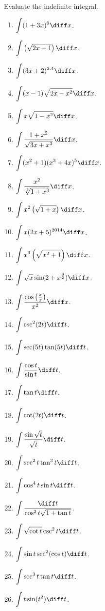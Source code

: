 Evaluate the indefinite integral.
\begin{multicols}{3}
\begin{enumerate}
\item $\displaystyle\int (1+3x)^9 \diff x $.
\item $\displaystyle\int \left(\sqrt{2x+1}\right)\diff x $.
\item $\displaystyle\int (3x+2)^{2.4}\diff x $.
\item $\displaystyle\int (x-1)\sqrt{2x-x^2} \diff x $.
\item $\displaystyle\int x\sqrt{1-x^2} \diff x $.
\item $\displaystyle\int \frac{1+x^2}{\sqrt{3x+x^3}}\diff x $.
\item $\displaystyle\int (x^2+1)(x^3+4x)^5 \diff x $.
\item $\displaystyle\int \frac{x^2}{\sqrt[3]{1+x^3}} \diff x $.
\item $\displaystyle\int x^2\left(\sqrt{1+x}\right)\diff x $.
\item $\displaystyle\int x(2x+5)^{2014} \diff x $.
\item $\displaystyle\int x^3\left(\sqrt{x^2+1}\right) \diff x $.

\item $\displaystyle\int \sqrt{x}\sin (2+x^{\frac{3}{2}}) \diff x $.
\item $\displaystyle\int \frac{\cos\left(\frac{\pi}{x}\right)}{x^2} \diff x $.

\item $\displaystyle\int \csc^2(2t) \diff t$.
\item $\displaystyle \int \sec (5t) \tan (5t) \diff t $.
\item $\displaystyle\int \frac{\cos t}{\sin t} \diff t $.
\item $\displaystyle\int \tan t \diff t $.
\item $\displaystyle\int \cot (2t) \diff t $.
\item $\displaystyle\int \frac{\sin \sqrt{t}}{\sqrt{t}} \diff t $.
\item $\displaystyle\int \sec^2t \tan^3t \diff t$.
\item $\displaystyle\int \cos^4t\sin t \diff t$.
\item $\displaystyle\int \frac{\diff t}{\cos^2 t\sqrt{1+\tan t}} $.
\item $\displaystyle\int \sqrt{\cot t} \csc^2 t\diff t $.
\item $\displaystyle\int \sin t \sec^2(\cos t)\diff t $.
\item $\displaystyle\int \sec^3 t \tan t\diff t $.
\item $\displaystyle\int t \sin(t^2) \diff t $.

\end{enumerate}
\end{multicols}

